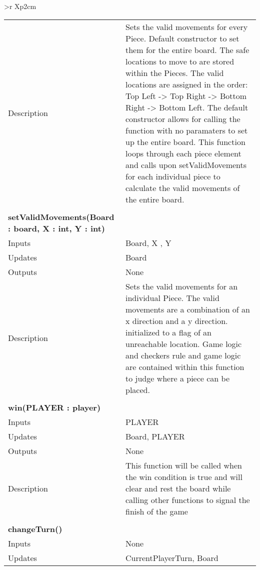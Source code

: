 \documentclass[10pt]{article}
\begin{document}
\begin{longtabu}{ >{\bfseries}r Xp{2cm} }
\begin{tabular}[t]{@{} p{4cm} p{8cm}}
                                    Description & Sets the valid movements for every Piece. Default constructor to set them for the entire board. The safe locations to move to are stored within the Pieces. The valid locations are assigned in the order: Top Left -> Top Right -> Bottom Right -> Bottom Left. The default constructor allows for calling the function with no paramaters to set up the entire board. This function loops through each piece element and calls upon setValidMovements for each individual piece to calculate the valid movements of the entire board. \\
                                    & \\
                                    \bf{setValidMovements(Board : board, X : int, Y : int)} & \\
                                    Inputs & Board, X , Y \\
                                    Updates & Board \\
                                    Outputs & None \\
                                    Description & Sets the valid movements for an individual Piece. The valid movements are a combination of an x direction and a y direction. initialized to a flag of an unreachable location. Game logic and checkers rule and game logic are contained within this function to judge where a piece can be placed. \\
                                    & \\
                                    \bf{win(PLAYER : player)} & \\
          		                    Inputs & PLAYER \\
                                    Updates & Board, PLAYER \\
                                    Outputs & None \\
                                    Description & This function will be called when the win condition is true and will clear and rest the board while calling other functions to signal the finish of the game \\
                                    & \\
                                    \bf{changeTurn()} & \\
          		                    Inputs & None \\
                                    Updates & CurrentPlayerTurn, Board \\

\end{tabular}
\end{longtabu}
\end{document}
